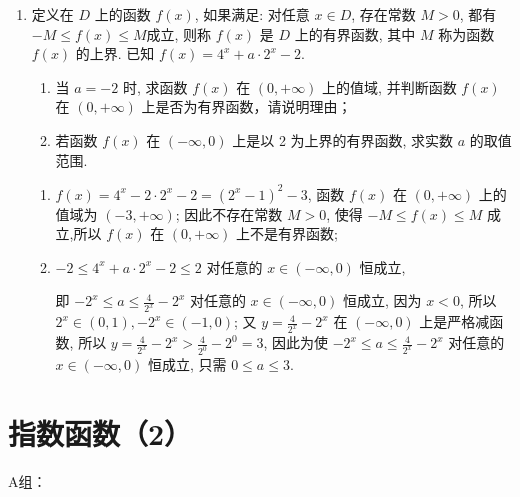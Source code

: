 \begin{enumerate}
\item 定义在 $D$ 上的函数 $f(x)$, 如果满足: 对任意 $x \in D$, 存在常数 $M>0$, 都有 $-M \leq f(x) \leq M$成立, 则称 $f(x)$ 是 $D$ 上的有界函数, 其中 $M$ 称为函数 $f(x)$ 的上界. 已知 $f(x)=4^x+a \cdot 2^x-2$.
\begin{enumerate}
\item 当 $a=-2$ 时, 求函数 $f(x)$ 在 $(0,+\infty)$ 上的值域, 并判断函数 $f(x)$ 在 $(0,+\infty)$ 上是否为有界函数，请说明理由；
\item 若函数 $f(x)$ 在 $(-\infty, 0)$ 上是以 2 为上界的有界函数, 求实数 $a$ 的取值范围.
\end{enumerate}
\begin{jieda}
\begin{enumerate}
\item $f(x)=4^x-2 \cdot 2^x-2=\left(2^x-1\right)^2-3$, 函数 $f(x)$ 在 $(0,+\infty)$ 上的值域为 $(-3,+\infty)$; 因此不存在常数 $M>0$, 使得 $-M \leq f(x) \leq M$ 成立,所以 $f(x)$ 在 $(0,+\infty)$ 上不是有界函数;
\item  $-2 \leq 4^x+a \cdot 2^x-2 \leq 2$ 对任意的 $x \in(-\infty, 0)$ 恒成立,

即 $-2^x \leq a \leq \frac{4}{2^x}-2^x$ 对任意的 $x \in(-\infty, 0)$ 恒成立,
因为 $x<0$, 所以 $2^x \in(0,1),-2^x \in(-1,0)$;
又 $y=\frac{4}{2^x}-2^x$ 在 $(-\infty, 0)$ 上是严格减函数, 所以 $y=\frac{4}{2^x}-2^x>\frac{4}{2^0}-2^0=3$,
因此为使 $-2^x \leq a \leq \frac{4}{2^x}-2^x$ 对任意的 $x \in(-\infty, 0)$ 恒成立, 只需 $0 \leq a \leq 3$.
\end{enumerate}

\end{jieda}



\end{enumerate}


\section{指数函数（2）}

A组：

